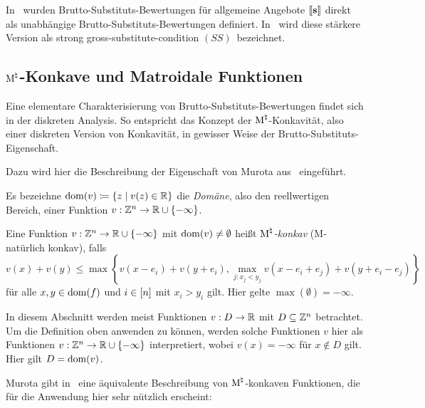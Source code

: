 \begin{bemerkung}
	In~\cite{PaesLeme2018} wurden Brutto-Substituts-Bewertungen für allgemeine Angebote $\left\llbracket \mathbf{s} \right\rrbracket$ direkt als unabhängige Brutto-Substituts-Bewertungen definiert.
	In~\cite{AkiyoshiShioura2015} wird diese stärkere Version als \glqq strong gross-substitute-condition $(SS)$\grqq\ bezeichnet.
\end{bemerkung}

\subsection{$\textrm{\textup{M}}^\natural$-Konkave und Matroidale Funktionen}\label{section-m-concavity}

Eine elementare Charakterisierung von Brutto-Substituts-Bewertungen findet sich in der diskreten Analysis.
So entspricht das Konzept der $\textrm{\textup{M}}^\natural$-Konkavität, also einer diskreten Version von Konkavität, in gewisser Weise der Brutto-Substituts-Eigenschaft.

Dazu wird hier die Beschreibung der Eigenschaft von Murota aus~\cite[Theorem~6.2 bzw.~Abschnitt~11.3]{Murota2003} eingeführt.

\begin{definition}
	Es bezeichne $\operatorname{dom}(v)\coloneqq \{ z \mid v(z)\in\mathbb{R} \}$ die \emph{Domäne}, also den reellwertigen Bereich, einer Funktion $v:\mathbb{Z}^n \rightarrow \mathbb{R} \cup \{ -\infty\}$.
\end{definition}

\begin{definition}
	Eine Funktion $v:\mathbb{Z}^n \rightarrow \mathbb{R} \cup \{-\infty\}$ mit $\operatorname{dom}(v) \neq \emptyset$ heißt \emph{$\textrm{\textup{M}}^\natural$-konkav} (\glqq M-natürlich konkav\grqq), falls \[
	v(x) + v(y) \leq
	\max \left\{
		v(x - e_i) + v(y + e_i),
		\max_{j: x_j < y_j} v(x - e_i + e_j) + v(y + e_i - e_j)
	\right\}
	\] für alle $x,y\in\operatorname{dom}(f)$ und $i\in\left[ n \right]$ mit $x_i > y_i$ gilt.
	Hier gelte $\max(\emptyset)=-\infty$.
\end{definition}


In diesem Abschnitt werden meist Funktionen $v: D\rightarrow \mathbb{R}$ mit $D\subseteq \mathbb{Z}^n$ betrachtet.
Um die Definition oben anwenden zu können, werden solche Funktionen $v$ hier als Funktionen $v: \mathbb{Z}^n\rightarrow \mathbb{R} \cup \{ -\infty\}$ interpretiert, wobei $v(x) = -\infty$ für $x\notin D$ gilt.
Hier gilt $D = \operatorname{dom}(v)$.

Murota gibt in~\cite[Theorem~6.24 bzw. Abschnitt~11.3]{Murota2003} eine äquivalente Beschreibung von $\textrm{\textup{M}}^\natural$-konkaven Funktionen, die für die Anwendung hier sehr nützlich erscheint:

